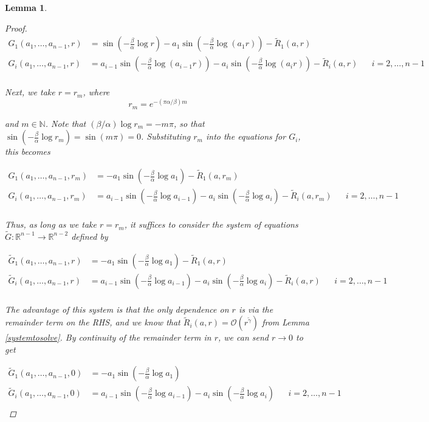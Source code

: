 \documentclass[12pt]{article}
\def\R{{\mathbb R}}
\def\N{{\mathbb N}}
\newtheorem{lemma}{Lemma}
\begin{document}
\begin{lemma}
\begin{proof}
\begin{align*}
G_1(a_1, \dots, a_{n-1}, r) &= \sin \left(-\frac{\beta}{\alpha} \log r \right) - a_1 \sin \left( - \frac{\beta}{\alpha} \log (a_1 r) \right) - \tilde{R}_1(a, r) \\
G_i(a_1, \dots, a_{n-1}, r) &= a_{i-1} \sin \left(-\frac{\beta}{\alpha} \log (a_{i-1} r) \right) - a_i \sin \left( - \frac{\beta}{\alpha} \log (a_i r) \right) - \tilde{R}_i(a, r) && i = 2, \dots, n-1 \\
\end{align*}

Next, we take $r = r_m$, where
\[
r_m =  e^{-(\pi \alpha / \beta) m}
\]

and $m \in \N$. Note that $(\beta / \alpha) \log r_m = -m \pi$, so that $\sin \left(-\frac{\beta}{\alpha} \log r_m \right) = \sin(m \pi) = 0$. Substituting $r_m$ into the equations for $G_i$, this becomes

\begin{align*}
G_1(a_1, \dots, a_{n-1}, r_m) &= -a_1 \sin \left( - \frac{\beta}{\alpha} \log a_1 \right) - \tilde{R}_1(a, r_m ) \\
G_i(a_1, \dots, a_{n-1}, r_m) &= a_{i-1} \sin \left(-\frac{\beta}{\alpha} \log a_{i-1} \right) - a_i \sin \left( - \frac{\beta}{\alpha} \log a_i \right) - \tilde{R}_i(a, r_m) && i = 2, \dots, n-1 \\
\end{align*}

Thus, as long as we take $r = r_m$, it suffices to consider the system of equations $\tilde{G}: \R^{n-1} \rightarrow \R^{n-2}$ defined by 

\begin{align}\label{arequation}
\tilde{G}_1(a_1, \dots, a_{n-1}, r) &= -a_1 \sin \left( - \frac{\beta}{\alpha} \log a_1 \right) - \tilde{R}_1(a, r) \\
\tilde{G}_i(a_1, \dots, a_{n-1}, r) &= a_{i-1} \sin \left(-\frac{\beta}{\alpha} \log a_{i-1} \right) - a_i \sin \left( - \frac{\beta}{\alpha} \log a_i \right) - \tilde{R}_i(a, r) && i = 2, \dots, n-1 \\
\end{align}

The advantage of this system is that the only dependence on $r$ is via the remainder term on the RHS, and we know that $\tilde{R}_i(a, r) = \mathcal{O}(r^{\tilde{\gamma}})$ from Lemma \ref{systemtosolve}. By continuity of the remainder term in $r$, we can send $r \rightarrow 0$ to get

\begin{align*}
\tilde{G}_1(a_1, \dots, a_{n-1}, 0) &= -a_1 \sin \left( - \frac{\beta}{\alpha} \log a_1 \right) \\
\tilde{G}_i(a_1, \dots, a_{n-1}, 0) &= a_{i-1} \sin \left(-\frac{\beta}{\alpha} \log a_{i-1} \right) - a_i \sin \left(-\frac{\beta}{\alpha} \log a_i \right) && i = 2, \dots, n-1 \\
\end{align*}


\end{proof}
\end{lemma}
\end{document}
